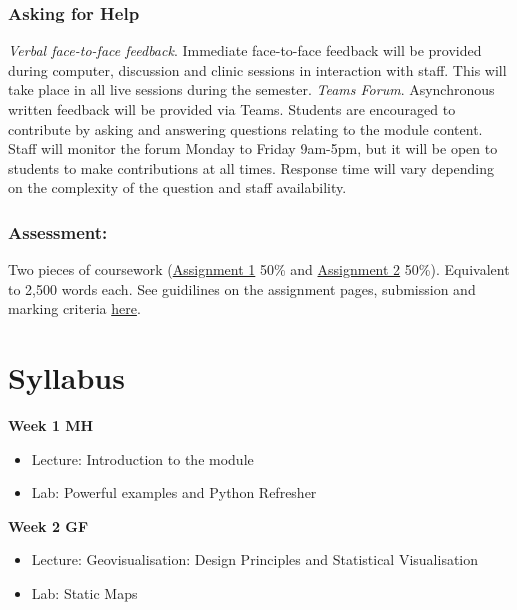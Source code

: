 \documentclass[
  letterpaper,
  DIV=11,
  numbers=noendperiod]{scrreprt}
\begin{document}
\subsection*{Asking for Help}\label{asking-for-help}

\emph{Verbal face-to-face feedback}. Immediate face-to-face feedback
will be provided during computer, discussion and clinic sessions in
interaction with staff. This will take place in all live sessions during
the semester. \emph{Teams Forum}. Asynchronous written feedback will be
provided via Teams. Students are encouraged to contribute by asking and
answering questions relating to the module content. Staff will monitor
the forum Monday to Friday 9am-5pm, but it will be open to students to
make contributions at all times. Response time will vary depending on
the complexity of the question and staff availability.

\subsection*{Assessment:}\label{assessment}

Two pieces of coursework
(\href{https://gdsl-ul.github.io/wma/general/assignmentI.html}{Assignment
1} 50\% and
\href{https://gdsl-ul.github.io/wma/general/assignmentI.html}{Assignment
2} 50\%). Equivalent to 2,500 words each. See guidilines on the
assignment pages, submission and marking criteria
\href{https://gdsl-ul.github.io/wma/general/assessments.html}{here}.


\chapter*{Syllabus}\label{syllabus}


\textbf{Week 1 MH}

\begin{itemize}
\item
  Lecture: Introduction to the module
\item
  Lab: Powerful examples and Python Refresher
\end{itemize}

\textbf{Week 2 GF}

\begin{itemize}
\item
  Lecture: Geovisualisation: Design Principles and Statistical
  Visualisation
\item
  Lab: Static Maps
\end{itemize}
\end{document}
